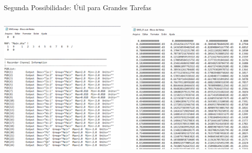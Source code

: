 \begin{frame}{Segunda Possibilidade: Útil para Grandes Tarefas}
\centering


\begin{columns}

\centering
\includegraphics[width=0.80\linewidth]{./figuras/Exportacao/Export2-map}

\centering
\includegraphics[width=0.80\linewidth]{./figuras/Exportacao/Export2-out}


\end{columns}


\end{frame}


